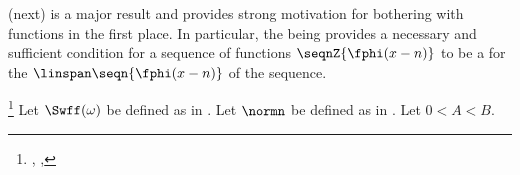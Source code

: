 (next) is a major result and provides strong motivation for
bothering with  functions in the first place.
In particular, the  being  provides a necessary and sufficient condition
for a sequence of functions $\seqnZ{\fphi(x-n)}$ to be a  
for the  $\linspan\seqn{\fphi(x-n)}$ of the sequence.
\begin{theorem}
\footnote{
  ,
  ,
  }
\label{thm:rbasis_S}
Let $\Swff(\omega)$ be defined as in .
Let $\normn$ be defined as in .
Let $0<A<B$.
\end{theorem}
